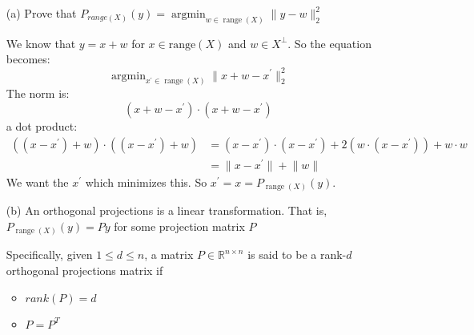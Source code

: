 \documentclass{article}
\begin{document}
    \begin{itemize}
        \item [(a)] Prove that $P_{range(X)}(y) = \mathop{argmin}_{w \in \mathop{range}(X)} \lVert y - w \rVert^{2}_{2}$
            \begin{answer}
                We know that $y = x + w$ for $x \in \text{range}(X)$ and $w \in X^{\perp}$. So the equation becomes:
                    \begin{equation*}
                        \mathop{argmin}_{x^{\prime} \in \mathop{range}(X)} \lVert x + w - x^{\prime} \rVert^{2}_{2}
                    \end{equation*}
                The norm is:
                    \begin{equation*}
                        (x + w - x^{\prime}) \cdot (x + w - x^{\prime})
                    \end{equation*}
                a dot product:
                    \begin{align*}
                        ((x - x^{\prime}) + w) \cdot ((x - x^{\prime}) + w) &= (x - x^{\prime})\cdot (x - x^{\prime}) + 2 (w \cdot (x - x^{\prime})) + w \cdot w \\
                                                                            &= \lVert x - x^{\prime} \rVert + \lVert w \rVert                                      
                    \end{align*}
                We want the $x^{\prime}$ which minimizes this. So $x^{\prime} = x = P_{\mathop{range}(X)}(y)$.
            \end{answer}

        \item [(b)] An orthogonal projections is a linear transformation. That is, $P_{\mathop{range}(X)}(y) = Py$ for some projection matrix $P$

        Specifically, given $1 \leq d \leq n$, a matrix $P \in \mathbb{R}^{n \times n}$ is said to be a rank-$d$ orthogonal projections matrix if 
            \begin{itemize}
                \item $rank(P) = d$

                \item $P = P^{T}$


\end{itemize}
\end{itemize}
\end{document}
